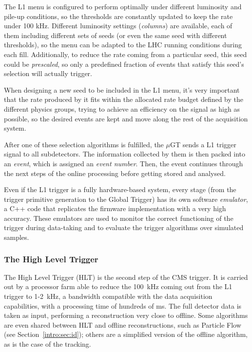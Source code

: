 \documentclass[../main.tex]{subfiles}
\begin{document}
The L1 menu is configured to perform optimally under different luminosity and pile-up conditions, so the thresholds are constantly updated to keep the rate under 100 kHz. Different luminosity settings (\textit{columns}) are available, each of them including different sets of seeds (or even the same seed with different thresholds), so the menu can be adapted to the LHC running conditions during each fill. Additionally, to reduce the rate coming from a particular seed, this seed could be \textit{prescaled}, so only a predefined fraction of events that satisfy this seed's selection will actually trigger.

When designing a new seed to be included in the L1 menu, it's very important that the rate produced by it fits within the allocated rate budget defined by the different physics groups, trying to achieve an efficiency on the signal as high as possible, so the desired events are kept and move along the rest of the acquisition system.

After one of these selection algorithms is fulfilled, the $\mu$GT sends a L1 trigger signal to all subdetectors. The information collected by them is then packed into an \textit{event}, which is assigned an \textit{event number}. Then, the event continues through the next steps of the online processing before getting stored and analysed.

Even if the L1 trigger is a fully hardware-based system, every stage (from the trigger primitive generation to the Global Trigger) has its own software \textit{emulator}, a C++ code that replicates the firmware implementation with a very high accuracy. These emulators are used to monitor the correct functioning of the trigger during data-taking and to evaluate the trigger algorithms over simulated samples.

\subsubsection{The High Level Trigger}

The High Level Trigger (HLT) is the second step of the CMS trigger. It is carried out by a processor farm able to reduce the 100~kHz coming out from the L1 trigger to 1-2~kHz, a bandwidth compatible with the data acquisition capabilities, with a processing time of hundreds of ms. The full detector data is taken as input, performing a reconstruction very close to offline. Some algorithms are even shared between HLT and offline reconstructions, such as Particle Flow (see Section~\ref{intro:sec:id}); others are a simplified version of the offline algorithm, as is the case of the tracking.
\end{document}
